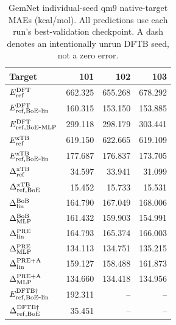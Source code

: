 \begin{table}[H]
\centering
\scriptsize
\setlength{\tabcolsep}{4pt}
\renewcommand{\arraystretch}{1.35}
\caption{GemNet individual-seed qm9 native-target MAEs (kcal/mol). All predictions use each run's best-validation checkpoint. A dash denotes an intentionally unrun DFTB seed, not a zero error.}
\begin{tabular}{lrrr}
\toprule
Target & 101 & 102 & 103 \\
\midrule
\(E_{\rm ref}^{\rm DFT}\) & 662.325 & 655.268 & 678.292 \\
\(E_{\rm ref,BoE\mbox{-}lin}^{\rm DFT}\) & 160.315 & 153.150 & 153.885 \\
\(E_{\rm ref,BoE\mbox{-}MLP}^{\rm DFT}\) & 299.118 & 298.179 & 303.441 \\
\(E_{\rm ref}^{\rm xTB}\) & 619.150 & 622.665 & 619.109 \\
\(E_{\rm ref,BoE\mbox{-}lin}^{\rm xTB}\) & 177.687 & 176.837 & 173.705 \\
\(\Delta^{\rm xTB}_{\rm ref}\) & 34.597 & 33.941 & 31.099 \\
\(\Delta^{\rm xTB}_{\rm ref,BoE}\) & 15.452 & 15.733 & 15.531 \\
\(\Delta^{\rm BoB}_{\rm lin}\) & 164.790 & 167.049 & 168.006 \\
\(\Delta^{\rm BoB}_{\rm MLP}\) & 161.432 & 159.903 & 154.991 \\
\(\Delta^{\rm PRE}_{\rm lin}\) & 164.793 & 165.374 & 166.003 \\
\(\Delta^{\rm PRE}_{\rm MLP}\) & 134.113 & 134.751 & 135.215 \\
\(\Delta^{\rm PRE+A}_{\rm lin}\) & 159.127 & 158.488 & 161.873 \\
\(\Delta^{\rm PRE+A}_{\rm MLP}\) & 134.660 & 134.418 & 134.956 \\
\(E_{\rm ref,BoE\mbox{-}lin}^{\rm DFTB\dagger}\) & 192.311 & -- & -- \\
\(\Delta^{\rm DFTB\dagger}_{\rm ref,BoE}\) & 35.451 & -- & -- \\
\bottomrule
\end{tabular}
\end{table}
